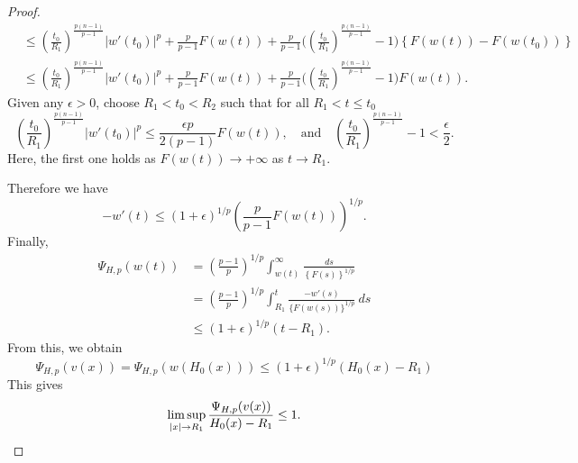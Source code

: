 \documentclass[11pt]{amsart}
\numberwithin{equation}{section}
\begin{document}
\begin{proof}
\begin{equation*}
\begin{split}
            &\leq \left(\frac{t_{0}}{R_{1}}\right)^{\frac{p(n-1)}{p-1}}|w'(t_{0})|^{p}+\frac{p}{p-1}F(w(t))+\frac{p}{p-1}\bigg(\left(\frac{t_{0}}{R_{1}}\right)^{\frac{p(n-1)}{p-1}}-1\bigg)\left\{F(w(t))-F(w(t_{0}))\right\}\\
            &\leq \left(\frac{t_{0}}{R_{1}}\right)^{\frac{p(n-1)}{p-1}}|w'(t_{0})|^{p}+\frac{p}{p-1}F(w(t))+\frac{p}{p-1}\bigg(\left(\frac{t_{0}}{R_{1}}\right)^{\frac{p(n-1)}{p-1}}-1\bigg)F(w(t)).
            \end{split}
    \end{equation*}
    Given any $\epsilon>0$, choose $R_{1}<t_{0}<R_{2}$ such that for all $R_{1}<t\leq t_{0}$
    \begin{equation*}
        \left(\frac{t_{0}}{R_{1}}\right)^{\frac{p(n-1)}{p-1}}|w'(t_{0})|^{p}\leq  \frac{\epsilon p}{2(p-1)}F(w(t)), \quad \text{and}\quad\left(\frac{t_{0}}{R_{1}}\right)^{\frac{p(n-1)}{p-1}}-1<\frac{\epsilon}{2}.
    \end{equation*}
    Here, the first one holds as $F(w(t))\to +\infty$ as $t\to R_{1}$.

    Therefore we have 
    \begin{equation*}
        -w'(t)\leq (1+\epsilon)^{1/p} \left(\frac{p}{p-1}F(w(t))\right)^{1/p}.
    \end{equation*}
    Finally,
    \begin{equation*}
    \begin{split}
         \Psi_{H,p}(w(t))&=\left(\frac{p-1}{p}\right)^{1/p}\int_{w(t)}^{\infty}\frac{ds}{\left\{F(s)\right\}^{1/p}}\\
         &=\left(\frac{p-1}{p}\right)^{1/p}\int^{t}_{R_{1}} \frac{-w'(s)}{\{F(w(s))\}^{1/p}}\ ds\\
         &\leq (1+\epsilon)^{1/p}(t-R_{1}).
         \end{split}
    \end{equation*}
    From this, we obtain
    \begin{equation*}
            \Psi_{H,p}(v(x))=\Psi_{H,p}(w(H_{0}(x)))\leq (1+\epsilon)^{1/p}(H_{0}(x)-R_{1})
    \end{equation*}
    This gives 
    \begin{equation*}
        \limsup_{|x|\to R_{1}}\frac{\Psi_{H,p}(v(x))}{{H_{0}}(x)-R_{1}}\leq 1.\qedhere
    \end{equation*}
\end{proof}
\end{document}
